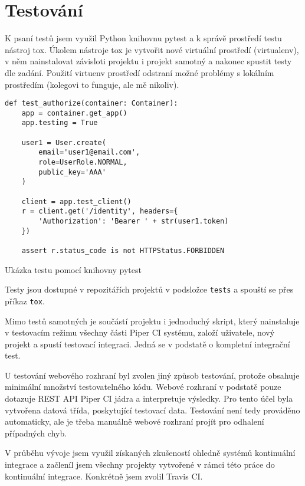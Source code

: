 \chapter{Testování}

K psaní testů jsem využil Python knihovnu pytest a k správě prostředí testu nástroj tox.
Úkolem nástroje tox je vytvořit nové virtuální prostředí (virtualenv), v něm nainstalovat závisloti projektu i projekt samotný a nakonec spustit testy dle zadání.
Použití virtuenv prostředí odstraní možné problémy s lokálním prostředím (kolegovi to funguje, ale mě nikoliv).

\begin{listing}[ht]
\begin{verbatim}
def test_authorize(container: Container):
    app = container.get_app()
    app.testing = True

    user1 = User.create(
        email='user1@email.com',
        role=UserRole.NORMAL,
        public_key='AAA'
    )

    client = app.test_client()
    r = client.get('/identity', headers={
        'Authorization': 'Bearer ' + str(user1.token)
    })

    assert r.status_code is not HTTPStatus.FORBIDDEN
\end{verbatim}
\caption{Ukázka testu pomocí knihovny pytest}
\end{listing}

Testy jsou dostupné v repozitářích projektů v podsložce \verb|tests| a spouští se přes příkaz \verb|tox|.

Mimo testů samotných je součástí projektu i jednoduchý skript, který nainstaluje v testovacím režimu všechny části Piper CI systému, založí uživatele, nový projekt a spustí testovací integraci.
Jedná se v podstatě o kompletní integrační test.

U testování webového rozhraní byl zvolen jiný způsob testování, protože obsahuje minimální množství testovatelného kódu.
Webové rozhraní v podstatě pouze dotazuje REST API Piper CI jádra a interpretuje výsledky.
Pro tento účel byla vytvořena  datová třída, poskytující testovací data.
Testování není tedy prováděno automaticky, ale je třeba manuálně webové rozhraní projít pro odhalení případných chyb.

V průběhu vývoje jsem využil získaných zkušeností ohledně systémů kontinuální integrace a začleníl jsem všechny projekty vytvořené v rámci této práce do kontinuální integrace.
Konkrétně jsem zvolil Travis CI.

